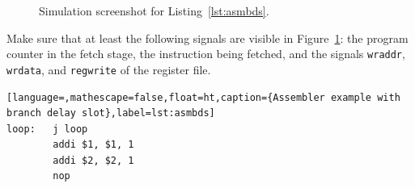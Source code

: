 
\begin{figure}[ht!]
  \centering
  \caption{Simulation screenshot for Listing~\ref{lst:asmbds}.}
  \label{fig:sim2}
\end{figure}

Make sure that at least the following signals are visible in
Figure~\ref{fig:sim2}: the program counter in the fetch stage, the
instruction being fetched, and the signals \texttt{wraddr},
\texttt{wrdata}, and \texttt{regwrite} of the register file.

\begin{lstlisting}[language=,mathescape=false,float=ht,caption={Assembler example with branch delay slot},label=lst:asmbds]
loop:   j loop
        addi $1, $1, 1
        addi $2, $2, 1
        nop
\end{lstlisting}
